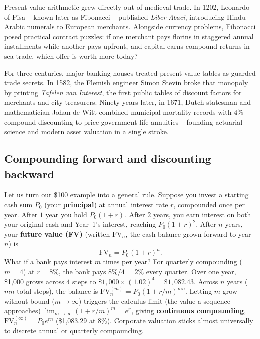 \begin{historybox}
Present-value arithmetic grew directly out of medieval trade. In 1202, Leonardo of Pisa -- known later as Fibonacci -- published \emph{Liber Abaci}, introducing Hindu-Arabic numerals to European merchants. Alongside currency problems, Fibonacci posed practical contract puzzles: if one merchant pays florins in staggered annual installments while another pays upfront, and capital earns compound returns in sea trade, which offer is worth more today?

For three centuries, major banking houses treated present-value tables as guarded trade secrets. In 1582, the Flemish engineer Simon Stevin broke that monopoly by printing \emph{Tafelen van Interest}, the first public tables of discount factors for merchants and city treasurers. Ninety years later, in 1671, Dutch statesman and mathematician Johan de Witt combined municipal mortality records with $4\%$ compound discounting to price government life annuities -- founding actuarial science and modern asset valuation in a single stroke.
\end{historybox}

\subsection{Compounding forward and discounting backward}

Let us turn our \$100 example into a general rule. Suppose you invest a starting cash sum $P_0$ (your \textbf{principal}) at annual interest rate $r$, compounded once per year. After $1$ year you hold $P_0(1+r)$. After $2$ years, you earn interest on both your original cash and Year~1's interest, reaching $P_0(1+r)^2$. After $n$ years, your \textbf{future value (FV)} (written $\text{FV}_n$, the cash balance grown forward to year $n$) is
\[
 \text{FV}_n = P_0(1 + r)^n.
\]
What if a bank pays interest $m$ times per year? For quarterly compounding ($m = 4$) at $r = 8\%$, the bank pays $8\% / 4 = 2\%$ every quarter. Over one year, \$1,000 grows across $4$ steps to $\$1{,}000 \times (1.02)^4 = \$1{,}082.43$. Across $n$ years ($mn$ total steps), the balance is $\text{FV}_n^{(m)} = P_0(1 + r/m)^{mn}$. Letting $m$ grow without bound ($m \to \infty$) triggers the calculus limit (the value a sequence approaches) $\lim_{m \to \infty}(1 + r/m)^m = e^r$, giving \textbf{continuous compounding}, $\text{FV}_n^{(\infty)} = P_0 e^{rn}$ (\$1,083.29 at $8\%$). Corporate valuation sticks almost universally to discrete annual or quarterly compounding.

